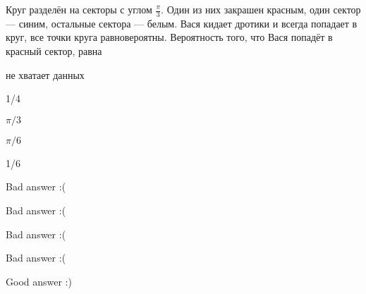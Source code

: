 
\begin{question}
Круг разделён на секторы с углом \(\frac{\pi}{3}\). Один из них закрашен
красным, один сектор --- синим, остальные сектора --- белым. Вася кидает
дротики и всегда попадает в круг, все точки круга равновероятны.
Вероятность того, что Вася попадёт в красный сектор, равна
\begin{answerlist}
  \item не хватает данных
  \item 1/4
  \item \(\pi / 3\)
  \item \(\pi / 6\)
  \item 1/6
\end{answerlist}
\end{question}

\begin{solution}
\begin{answerlist}
  \item Bad answer :(
  \item Bad answer :(
  \item Bad answer :(
  \item Bad answer :(
  \item Good answer :)
\end{answerlist}
\end{solution}

